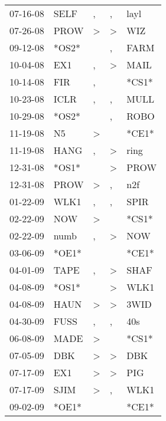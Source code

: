 \begin{supertabular}{lllll}
 07-16-08 &   SELF &                , &                , &   layl \\
 07-26-08 &   PROW &     \textgreater &     \textgreater &    WIZ \\
 09-12-08 &  *OS2* &                  &                , &   FARM \\
 10-04-08 &    EX1 &                , &     \textgreater &   MAIL \\
 10-14-08 &    FIR &                , &                  &  *CS1* \\
 10-23-08 &   ICLR &                , &                , &   MULL \\
 10-29-08 &  *OS2* &                  &                , &   ROBO \\
 11-19-08 &     N5 &     \textgreater &                  &  *CE1* \\
 11-19-08 &   HANG &                , &     \textgreater &   ring \\
 12-31-08 &  *OS1* &                  &     \textgreater &   PROW \\
 12-31-08 &   PROW &     \textgreater &                , &    n2f \\
 01-22-09 &   WLK1 &                , &                , &   SPIR \\
 02-22-09 &    NOW &     \textgreater &                  &  *CS1* \\
 02-22-09 &   numb &                , &     \textgreater &    NOW \\
 03-06-09 &  *OE1* &                  &                  &  *CE1* \\
 04-01-09 &   TAPE &                , &     \textgreater &   SHAF \\
 04-08-09 &  *OS1* &                  &     \textgreater &   WLK1 \\
 04-08-09 &   HAUN &     \textgreater &     \textgreater &   3WID \\
 04-30-09 &   FUSS &                , &                , &    40s \\
 06-08-09 &   MADE &     \textgreater &                  &  *CS1* \\
 07-05-09 &    DBK &     \textgreater &     \textgreater &    DBK \\
 07-17-09 &    EX1 &     \textgreater &     \textgreater &    PIG \\
 07-17-09 &   SJIM &     \textgreater &                , &   WLK1 \\
 09-02-09 &  *OE1* &                  &                  &  *CE1* \\

\end{supertabular}
